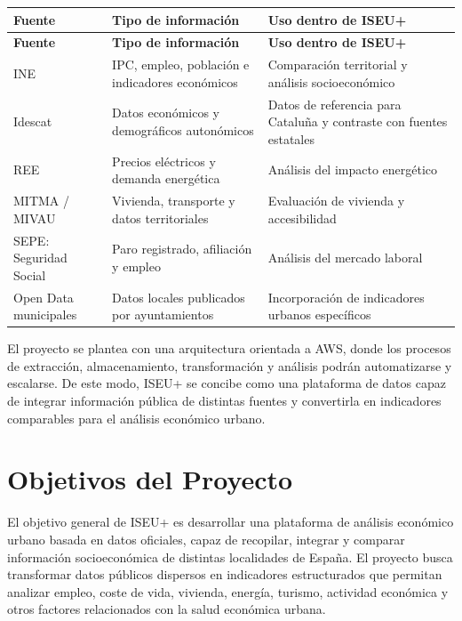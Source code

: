 \begin{longtable}{>{\raggedright\arraybackslash}p{} >{\raggedright\arraybackslash}p{} >{\raggedright\arraybackslash}p{}}
\toprule
\textbf{Fuente} & \textbf{Tipo de información} & \textbf{Uso dentro de ISEU+} \\
\midrule
\endfirsthead
\toprule
\textbf{Fuente} & \textbf{Tipo de información} & \textbf{Uso dentro de ISEU+} \\
\midrule
\endhead
INE & IPC, empleo, población e indicadores económicos & Comparación territorial y análisis socioeconómico \\
Idescat & Datos económicos y demográficos autonómicos & Datos de referencia para Cataluña y contraste con fuentes estatales \\
REE & Precios eléctricos y demanda energética & Análisis del impacto energético \\
MITMA / MIVAU & Vivienda, transporte y datos territoriales & Evaluación de vivienda y accesibilidad \\
SEPE: Seguridad Social & Paro registrado, afiliación y empleo & Análisis del mercado laboral \\
Open Data municipales & Datos locales publicados por ayuntamientos & Incorporación de indicadores urbanos específicos \\
\bottomrule
\end{longtable}

El proyecto se plantea con una arquitectura orientada a AWS, donde los procesos de extracción, almacenamiento, transformación y análisis podrán automatizarse y escalarse. De este modo, ISEU+ se concibe como una plataforma de datos capaz de integrar información pública de distintas fuentes y convertirla en indicadores comparables para el análisis económico urbano.

\section{Objetivos del Proyecto}

El objetivo general de ISEU+ es desarrollar una plataforma de análisis económico urbano basada en datos oficiales, capaz de recopilar, integrar y comparar información socioeconómica de distintas localidades de España. El proyecto busca transformar datos públicos dispersos en indicadores estructurados que permitan analizar empleo, coste de vida, vivienda, energía, turismo, actividad económica y otros factores relacionados con la salud económica urbana.

